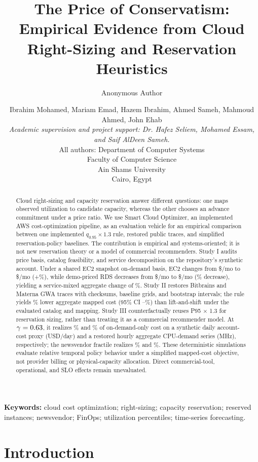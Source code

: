 \documentclass[11pt]{article}
\title{The Price of Conservatism: Empirical Evidence from Cloud Right-Sizing and Reservation Heuristics}
\author{Anonymous Author}
\author{\small Ibrahim Mohamed, Mariam Emad, Hazem Ibrahim, Ahmed Sameh, Mahmoud Ahmed, John Ehab\\[3pt]
\footnotesize\emph{Academic supervision and project support: Dr. Hafez Seliem, Mohamed Essam, and Saif AlDeen Sameh.}\\[3pt]
\small All authors: Department of Computer Systems\\
\small Faculty of Computer Science\\
\small Ain Shams University\\
\small Cairo, Egypt}
\date{}
\begin{document}
\maketitle

\begin{abstract}
Cloud right-sizing and capacity reservation answer different questions: one
maps observed utilization to candidate capacity, whereas the other chooses an
advance commitment under a price ratio. We use Smart Cloud Optimizer, an
implemented AWS cost-optimization pipeline, as an evaluation vehicle for an
empirical comparison between one implemented \(q_{0.95}\times1.3\) rule,
restored public traces, and simplified reservation-policy baselines. The
contribution is empirical and systems-oriented; it is not new reservation
theory or a model of commercial recommenders. Study I audits price basis,
catalog feasibility, and service decomposition on the repository's synthetic
account. Under a shared EC2 snapshot on-demand basis, EC2 changes from
\$\evidEcTwoCurrent{}/mo to \$\evidEcTwoOptimized{}/mo
(+\evidEcTwoDeltaPct\%), while demo-priced RDS decreases from
\$\evidRdsCurrent{}/mo to \$\evidRdsOptimized{}/mo
(\evidRdsSavingsPct\% decrease), yielding a service-mixed aggregate change of
\evidAggregateDeltaPct\%. Study II restores Bitbrains and Materna GWA traces
with checksums, baseline grids, and bootstrap intervals; the rule yields
\extOverallSavingsPct\% lower aggregate mapped cost (95\% CI
\extOverallSavingsCiLow--\extOverallSavingsCiHigh\%) than lift-and-shift under
the evaluated catalog and mapping. Study III counterfactually reuses P95
\(\times\) 1.3 for reservation sizing, rather than treating it as a commercial
recommender model. At \(\gamma=0.63\), it realizes
\polPctHeur\% and \extPolPctHeur\% of on-demand-only cost on a synthetic daily
account-cost proxy (USD/day) and a restored hourly aggregate CPU-demand series
(MHz), respectively; the newsvendor fractile realizes \polPctNv\% and
\extPolPctNv\%. These deterministic simulations evaluate relative temporal
policy behavior under a simplified mapped-cost objective, not provider billing
or physical-capacity allocation. Direct commercial-tool, operational, and SLO
effects remain unevaluated.
\end{abstract}

\noindent\textbf{Keywords:} cloud cost optimization; right-sizing; capacity
reservation; reserved instances; newsvendor; FinOps; utilization percentiles;
time-series forecasting.

\section{Introduction}
\end{document}
